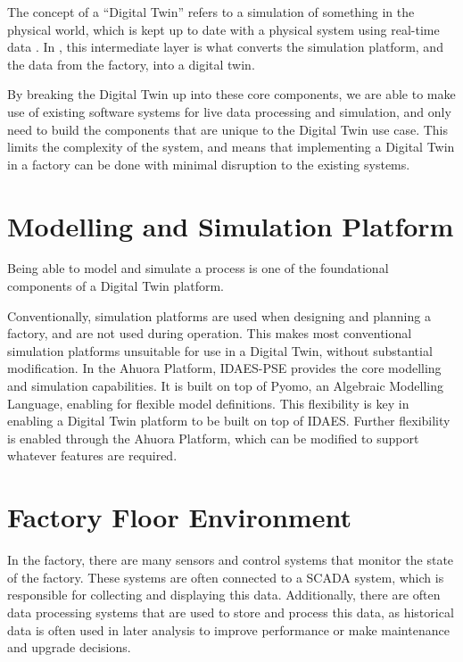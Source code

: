 The concept of a “Digital Twin” refers to a simulation of something in the physical world, which is kept up to date with a physical system using real-time data \cite{yu2022energy}.
In , this intermediate layer is what converts the simulation platform, and the data from the factory, into a digital twin. 

By breaking the Digital Twin up into these core components, we are able to make use of existing software systems for live data processing and simulation, and only need to build the components that are unique to the Digital Twin use case. This limits the complexity of the system, and means that implementing a Digital Twin in a factory can be done with minimal disruption to the existing systems.


\section{Modelling and Simulation Platform}


Being able to model and simulate a process is one of the foundational components of a Digital Twin platform. 

Conventionally, simulation platforms are used when designing and planning a factory, and are not used during operation. This makes most conventional simulation platforms unsuitable for use in a Digital Twin, without substantial modification.
In the Ahuora Platform, IDAES-PSE provides the core modelling and simulation capabilities. 
It is built on top of Pyomo, an Algebraic Modelling Language, enabling for flexible model definitions.
This flexibility is key in enabling a Digital Twin platform to be built on top of IDAES. 
Further flexibility is enabled through the Ahuora Platform, which can be modified to support whatever features are required.

\section{Factory Floor Environment}

In the factory, there are many sensors and control systems that monitor the state of the factory. These systems are often connected to a SCADA system, which is responsible for collecting and displaying this data.
Additionally, there are often data processing systems that are used to store and process this data, as historical data is often used in later analysis to improve performance or make maintenance and upgrade decisions.

